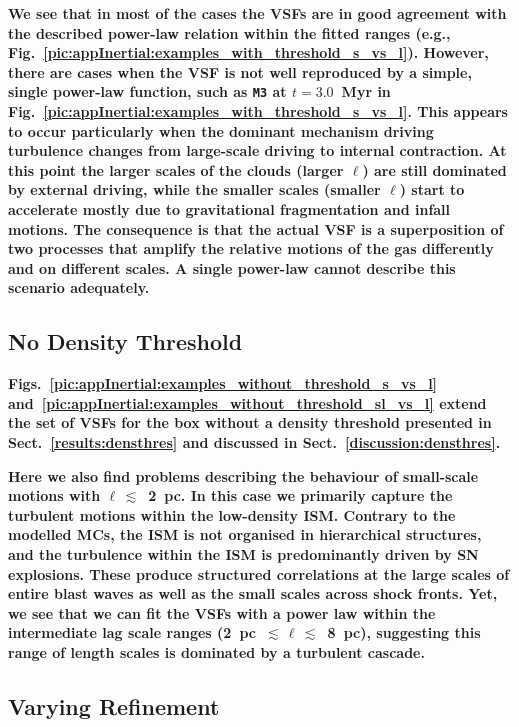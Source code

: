 \textbf{
We see that in most of the cases the VSFs are in good agreement with the described power-law relation within the fitted ranges (e.g., Fig.~\ref{pic:appInertial:examples_with_threshold_s_vs_l}). 
However, there are cases when the VSF is not well reproduced by a simple, single power-law function, such as \texttt{M3} at $t=3.0$~Myr in Fig.~\ref{pic:appInertial:examples_with_threshold_s_vs_l}.
This appears to occur particularly when the dominant mechanism driving turbulence changes from large-scale driving to internal contraction. 
At this point the  larger scales of the clouds (larger $\ell$) are still dominated by external driving, while the smaller scales (smaller $\ell$) start to accelerate mostly due to gravitational fragmentation and infall motions.
The consequence is that the actual VSF is a superposition of two processes that amplify the relative motions of the gas differently and on different scales.
A single power-law cannot describe this scenario adequately. 
}


\subsection{No Density Threshold} \label{Bsub:full}

\textbf{Figs.~\ref{pic:appInertial:examples_without_threshold_s_vs_l} and~\ref{pic:appInertial:examples_without_threshold_sl_vs_l} extend the set of VSFs for the box without a density threshold presented in Sect.~\ref{results:densthres} and discussed in Sect.~\ref{discussion:densthres}.}

\textbf{
Here we also find problems describing the behaviour of small-scale motions with $\ell\,\lesssim$~2~pc.
In this case we primarily capture the turbulent motions within the low-density ISM. 
Contrary to the modelled MCs, the ISM is not organised in hierarchical structures, and the turbulence within the ISM is predominantly driven by SN explosions.
These produce structured correlations at the large scales of entire blast waves as well as the small scales across shock fronts.
Yet, we see that we can fit the VSFs with a power law within the intermediate lag scale ranges (2~pc~$\lesssim\,\ell\,\lesssim$~8~pc), suggesting this range of length scales is dominated by a turbulent cascade.
}

\subsection{Varying Refinement} \label{Bsub:Jeans}

